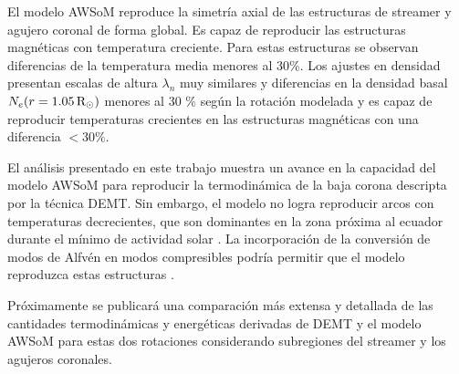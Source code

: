 \documentclass[baaa]{baaa}
\begin{document}
El modelo AWSoM reproduce la simetría axial de las estructuras de streamer y agujero coronal de forma global. Es capaz de reproducir las estructuras magnéticas con temperatura creciente. Para estas estructuras se observan diferencias de la temperatura media menores al 30\%. Los ajustes en densidad presentan escalas de altura $\lambda_n$ muy similares y diferencias en la densidad basal $N_e(r=1.05\,{\rm R_\odot})$  menores al 30 \% según la rotación modelada y es capaz de reproducir temperaturas crecientes en las estructuras magnéticas con una diferencia $<30 \%$. 
 
El análisis presentado en este trabajo muestra un  avance en la capacidad del modelo AWSoM para reproducir la termodinámica de la baja corona descripta por la técnica DEMT. Sin embargo, el modelo no logra reproducir arcos con temperaturas decrecientes, que son dominantes en la zona próxima al ecuador durante el mínimo de actividad solar \citep{nuevo_2013}.  La incorporación de la conversión de modos de Alfvén en modos compresibles podría permitir que el modelo reproduzca estas estructuras \citep{schiff_2016}.

Próximamente se publicará una comparación más extensa y detallada de las cantidades termodinámicas y energéticas derivadas de DEMT y el modelo AWSoM para estas dos rotaciones considerando subregiones del streamer y los agujeros coronales.




\small

 
\end{document}

